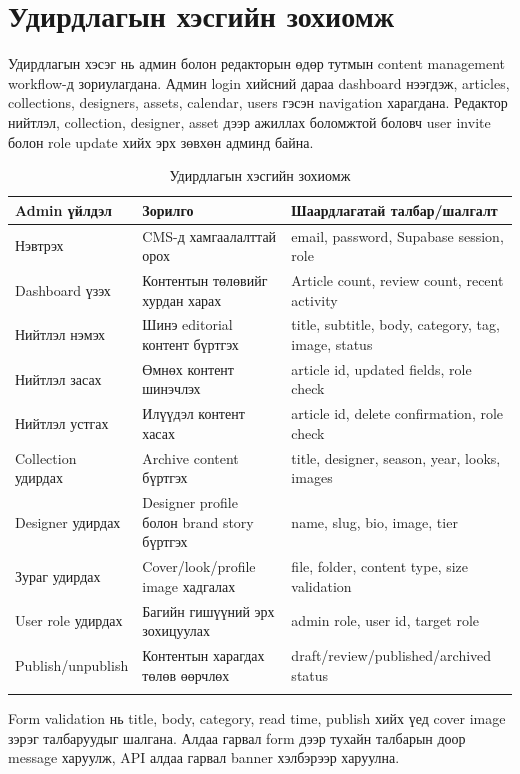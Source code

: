 \section{Удирдлагын хэсгийн зохиомж}
Удирдлагын хэсэг нь админ болон редакторын өдөр тутмын content management workflow-д зориулагдана. Админ login хийсний дараа dashboard нээгдэж, articles, collections, designers, assets, calendar, users гэсэн navigation харагдана. Редактор нийтлэл, collection, designer, asset дээр ажиллах боломжтой боловч user invite болон role update хийх эрх зөвхөн админд байна.

\begin{longtable}{|L{0.22\textwidth}|L{0.30\textwidth}|L{0.34\textwidth}|}
  \hline
  \textbf{Admin үйлдэл} & \textbf{Зорилго} & \textbf{Шаардлагатай талбар/шалгалт} \\ \hline
  Нэвтрэх & CMS-д хамгаалалттай орох & email, password, Supabase session, role \\ \hline
  Dashboard үзэх & Контентын төлөвийг хурдан харах & Article count, review count, recent activity \\ \hline
  Нийтлэл нэмэх & Шинэ editorial контент бүртгэх & title, subtitle, body, category, tag, image, status \\ \hline
  Нийтлэл засах & Өмнөх контент шинэчлэх & article id, updated fields, role check \\ \hline
  Нийтлэл устгах & Илүүдэл контент хасах & article id, delete confirmation, role check \\ \hline
  Collection удирдах & Archive content бүртгэх & title, designer, season, year, looks, images \\ \hline
  Designer удирдах & Designer profile болон brand story бүртгэх & name, slug, bio, image, tier \\ \hline
  Зураг удирдах & Cover/look/profile image хадгалах & file, folder, content type, size validation \\ \hline
  User role удирдах & Багийн гишүүний эрх зохицуулах & admin role, user id, target role \\ \hline
  Publish/unpublish & Контентын харагдах төлөв өөрчлөх & draft/review/published/archived status \\ \hline
  \caption{Удирдлагын хэсгийн зохиомж}
  \label{tab:ch3-admin-design}\\
\end{longtable}

Form validation нь title, body, category, read time, publish хийх үед cover image зэрэг талбаруудыг шалгана. Алдаа гарвал form дээр тухайн талбарын доор message харуулж, API алдаа гарвал banner хэлбэрээр харуулна.

